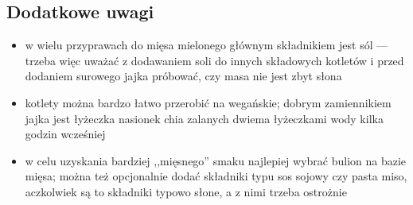 \subsection*{Dodatkowe uwagi}
\begin{itemize}
    \item w wielu przyprawach do mięsa mielonego głównym składnikiem jest sól --- trzeba więc uważać z dodawaniem soli do innych składowych kotletów i przed dodaniem surowego jajka próbować, czy masa nie jest zbyt słona
    \item kotlety można bardzo łatwo przerobić na wegańskie; dobrym zamiennikiem jajka jest łyżeczka nasionek chia zalanych dwiema łyżeczkami wody kilka godzin wcześniej
    \item w celu uzyskania bardziej ,,mięsnego'' smaku najlepiej wybrać bulion na bazie mięsa; można też opcjonalnie dodać składniki typu sos sojowy czy pasta miso, aczkolwiek są to składniki typowo słone, a z nimi trzeba ostrożnie
\end{itemize}

\newpage
